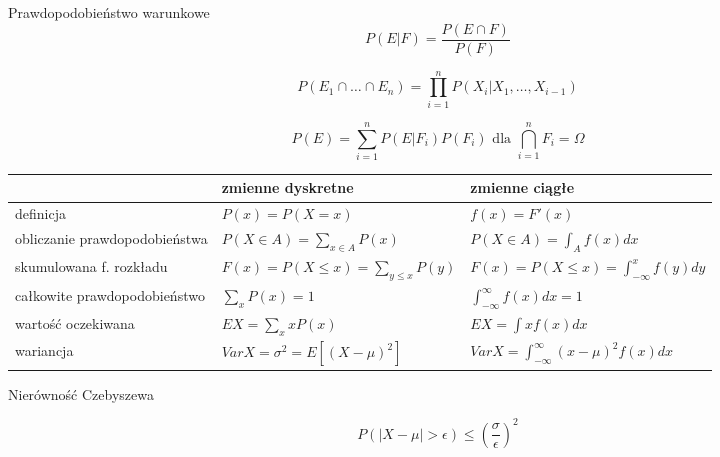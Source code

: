 \documentclass[a4paper]{article}
\begin{document}
    Prawdopodobieństwo warunkowe
    \begin{equation}
        P(E|F) = \frac{P(E \cap F)}{P(F)}
    \end{equation}

    \begin{equation}
        P(E_1 \cap \dots \cap E_n) = \prod_{i=1}^{n} P(X_i | X_1, \dots, X_{i-1})
    \end{equation}

    \begin{equation}
        P(E) = \sum_{i=1}^{n} P(E|F_i)P(F_i) \text{ dla } \bigcap_{i=1}^{n} F_i = \Omega
    \end{equation}

    \begin{table}[H]
        \begin{center}
            \begin{tabular}{ p{5cm} | p{5cm} p{5.5cm} }
                & zmienne dyskretne & zmienne ciągłe\\
                \toprule
                definicja & $P(x) = P(X=x)$ & $f(x) = F'(x)$\\
                obliczanie prawdopodobieństwa & $P(X \in A) = \sum_{x \in A} P(x)$ & $P(X \in A) = \int_{A} f(x)dx$\\
                skumulowana f. rozkładu & $F(x) = P(X \leq x) = \sum_{y \leq x}P(y)$ &
                $F(x) = P(X \leq x) = \int_{-\infty}^{x}f(y)dy$\\
                całkowite prawdopodobieństwo & $\sum_{x}P(x) = 1$ & $\int_{- \infty}^{\infty}f(x)dx = 1$\\
                wartość oczekiwana & $EX = \sum_{x} x P(x)$ & $EX = \int xf(x) dx$\\
                wariancja & $VarX = \sigma^2 = E[ (X - \mu)^2 ]$ & $VarX = \int_{- \infty}^{\infty} (x - \mu)^2 f(x) dx$\\
                \bottomrule
            \end{tabular}
        \end{center}
    \end{table}

    Nierówność Czebyszewa

    \begin{equation}
        P( |X - \mu| > \epsilon ) \leq (\frac{\sigma}{\epsilon})^2
    \end{equation}
\end{document}
